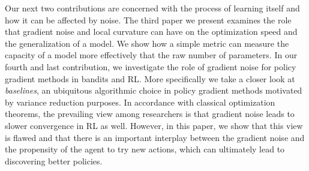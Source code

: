 Our next two contributions are concerned with the process of learning itself and
how it can be affected by noise. The third paper we present examines the role
that gradient noise and local curvature can have on the optimization speed and
the generalization of a model. We show how a simple metric can measure the capacity of a model more effectively that the raw number of parameters.
In our fourth and last contribution, we investigate the role of gradient noise for policy gradient methods in bandits and RL. More specifically we take a closer look at \emph{baselines}, an ubiquitous algorithmic choice in policy gradient methods motivated by variance reduction purposes. In accordance with classical optimization theorems, the prevailing view among researchers is that gradient noise leads to slower convergence in RL as well. However, in this paper, we show that this view is flawed and that there is an important interplay between the gradient noise and the propensity of the agent to try new actions, which can ultimately lead to discovering better policies.



















